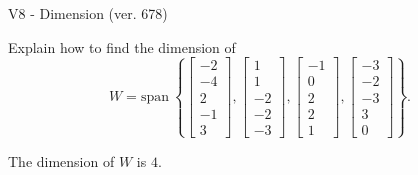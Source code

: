 \begin{exercise}
  \begin{exerciseTitle}V8 - Dimension (ver. 678)\end{exerciseTitle}
  \begin{exerciseStatement}
    Explain how to find the dimension of 
\[W=\mathrm{span}\ \left\{\left[\begin{array}{r}
-2 \\
-4 \\
2 \\
-1 \\
3
\end{array}\right] , \left[\begin{array}{r}
1 \\
1 \\
-2 \\
-2 \\
-3
\end{array}\right] , \left[\begin{array}{r}
-1 \\
0 \\
2 \\
2 \\
1
\end{array}\right] , \left[\begin{array}{r}
-3 \\
-2 \\
-3 \\
3 \\
0
\end{array}\right]\right\}.\]



  \end{exerciseStatement}
  \begin{exerciseAnswer}
   The dimension of \(W\) is  \(4\).
  


  \end{exerciseAnswer}
\end{exercise}